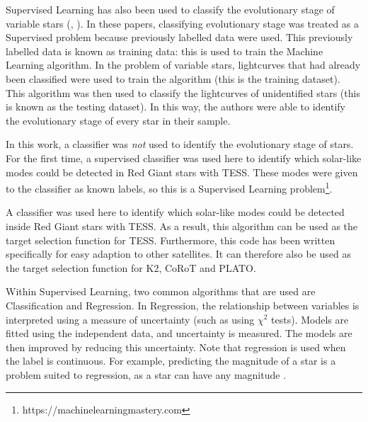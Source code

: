 \documentclass[a4paper,fleqn,usenatbib,useAMS]{mnras}
\newcommand{\pdet}{\ensuremath{P_{\rm det}\:}}
\begin{document}
Supervised Learning has also been used to classify the evolutionary stage of variable stars (\citet{nun_supervised_2014}, \citet{elorrieta_machine_2016}). In these papers, classifying evolutionary stage was treated as a Supervised problem because previously labelled data were used. This previously labelled data is known as training data: this is used to train the Machine Learning algorithm. In the problem of variable stars, lightcurves that had already been classified were used to train the algorithm (this is the training dataset). This algorithm was then used to classify the lightcurves of unidentified stars (this is known as the testing dataset). In this way, the authors were able to identify the evolutionary stage of every star in their sample.

In this work, a classifier was \textit{not} used to identify the evolutionary stage of stars. For the first time, a supervised classifier was used here to identify which solar-like modes could be detected in Red Giant stars with TESS. These modes were given to the classifier as known labels, so this is a Supervised Learning problem\footnote{https://machinelearningmastery.com}.

A classifier was used here to identify which solar-like modes could be detected inside Red Giant stars with TESS. As a result, this algorithm can be used as the target selection function for TESS. Furthermore, this code has been written specifically for easy adaption to other satellites. It can therefore also be used as the target selection function for K2, CoRoT and PLATO.


Within Supervised Learning, two common algorithms that are used are Classification and Regression. In Regression, the relationship between variables is interpreted using a measure of uncertainty (such as using $\chi^{2}$ tests). Models are fitted using the independent data, and uncertainty is measured. The models are then improved by reducing this uncertainty. Note that regression is used when the label is continuous. For example, predicting the magnitude of a star is a problem suited to regression, as a star can have any magnitude \citep{steinhardt_nonparametric_2018}.
\end{document}
